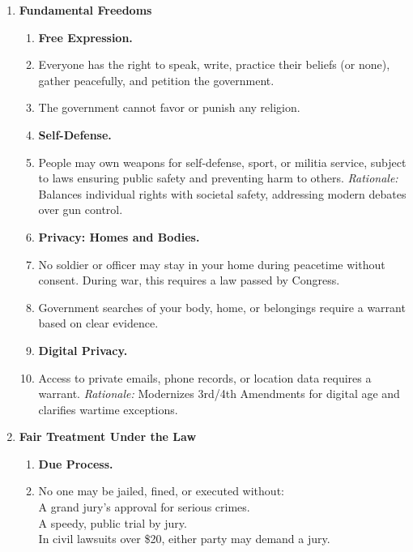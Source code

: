 \documentclass{article}
\begin{document}
\begin{multicols}{2}
\begin{enumerate}[label=\Alph*)]
\begin{enumerate}[label=\Alph*), start=4]
    \item \textbf{Fundamental Freedoms}
    
    \begin{enumerate}[label=2.1.\arabic*]
        \item[] \textbf{Free Expression.}
        \item Everyone has the right to speak, write, practice their beliefs (or none), gather peacefully, and petition the government.
        
        \item The government cannot favor or punish any religion.
        
        \item[] \textbf{Self-Defense.}
        \item People may own weapons for self-defense, sport, or militia service, subject to laws ensuring public safety and preventing harm to others.  
        \textit{Rationale:} Balances individual rights with societal safety, addressing modern debates over gun control.
        
        \item[] \textbf{Privacy: Homes and Bodies.}
        \item No soldier or officer may stay in your home during peacetime without consent. During war, this requires a law passed by Congress.
        
        \item Government searches of your body, home, or belongings require a warrant based on clear evidence.
        
        \item[] \textbf{Digital Privacy.}
        \item Access to private emails, phone records, or location data requires a warrant.  
        \textit{Rationale:} Modernizes 3rd/4th Amendments for digital age and clarifies wartime exceptions.
    \end{enumerate}
    
    \item \textbf{Fair Treatment Under the Law}
    
    \begin{enumerate}[label=2.2.\arabic*]
        \item[] \textbf{Due Process.}
        \item No one may be jailed, fined, or executed without: \\
        A grand jury’s approval for serious crimes. \\
        A speedy, public trial by jury. \\
        In civil lawsuits over \$20, either party may demand a jury.
        

\end{enumerate}
\end{enumerate}
\end{enumerate}
\end{multicols}
\end{document}
